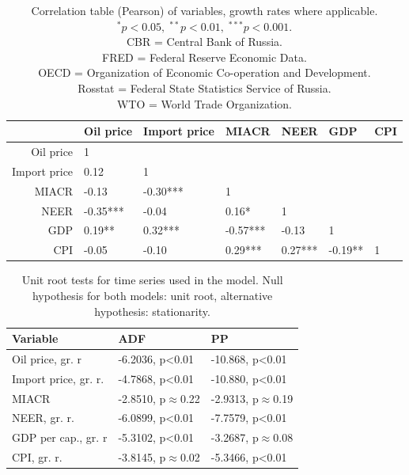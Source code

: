 \documentclass[12pt, a4paper]{extarticle}
\begin{document}
\begin{table}[h!]
\centering
	\begin{tabular}{@{}rllllll@{}}
	  \toprule
	 & Oil price & Import price & MIACR & NEER & GDP & CPI \\ 
	  \midrule
	 	Oil price & 1 &  &  &  &  &\\ 
  		Import price &  0.12  & 1 &  &  &  &\\ 
  		MIACR& -0.13  & -0.30*** & 1 &  &  &\\ 
  		NEER & -0.35*** & -0.04  &  0.16*  & 1 &  &\\ 
  		GDP &  0.19**  &  0.32*** & -0.57*** & -0.13  & 1 &\\ 
  		CPI & -0.05  & -0.10  &  0.29*** &  0.27*** & -0.19**  & 1\\ 
	   \bottomrule
	\end{tabular}
	\caption{Correlation table (Pearson) of variables, growth rates where applicable.\\ $^*p<0.05,\; ^{**}p<0.01,\;^{***}p<0.001$.\\
	CBR = Central Bank of Russia.\\
	FRED = Federal Reserve Economic Data.\\
	OECD = Organization of Economic Co-operation and Development.\\
	Rosstat = Federal State Statistics Service of Russia.\\
	WTO = World Trade Organization.}
	\label{table:correlation_variables}
\end{table}

\begin{table}[]
	\centering
		\begin{tabular}{@{}lll@{}}
			 \toprule
			Variable & ADF & PP \\
			\midrule
			Oil price, gr. r     & {-6.2036, p\textless{}0.01} &{-10.868, p\textless{}0.01}   \\
			Import price, gr. r. & {-4.7868, p\textless{}0.01} & {-10.880, p\textless{}0.01}    \\
			MIACR                & {-2.8510, p$\approx$0.22}          & {-2.9313, p$\approx$0.19}          \\
			NEER, gr. r.         & {-6.0899, p\textless{}0.01} & {-7.7579, p\textless{}0.01}   \\
			GDP per cap., gr. r  & {-5.3102, p\textless{}0.01} & {-3.2687, p$\approx$0.08} \\
			CPI, gr. r.          & {-3.8145, p$\approx$0.02}         & {-5.3466, p\textless{}0.01}\\
			\bottomrule
		\end{tabular}%
	\caption{Unit root tests for time series used in the model. Null hypothesis for both models: unit root, alternative hypothesis: stationarity.}
	\label{table:unit_roots}
\end{table}
\end{document}
